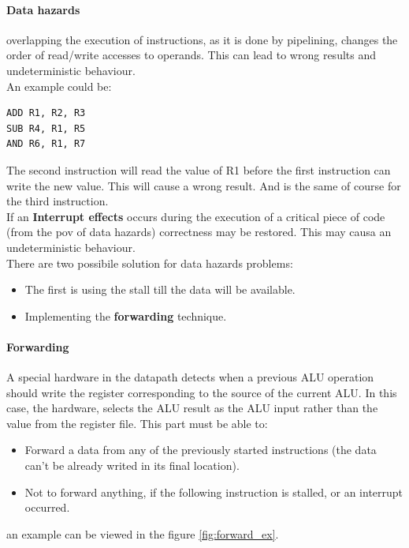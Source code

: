 \documentclass[12pt]{article}
\begin{document}
\paragraph{Data hazards} overlapping the execution of instructions, as it is done by pipelining, changes the order of read/write accesses to operands. This can lead to wrong results and undeterministic behaviour.\\
An example could be:\\
\begin{lstlisting}
ADD R1, R2, R3
SUB R4, R1, R5
AND R6, R1, R7
\end{lstlisting}
The second instruction will read the value of R1 before the first instruction can write the new value. This will cause a wrong result. And is the same of course for the third instruction.\\
If an \textbf{Interrupt effects} occurs during the execution of a critical piece of code (from the pov of data hazards) correctness may be restored. This may causa an undeterministic behaviour.\\
There are two possibile solution for data hazards problems:
\begin{itemize}
  \item The first is using the stall till the data will be available.
  \item Implementing the \textbf{forwarding} technique.
\end{itemize}

\paragraph{Forwarding} A special hardware in the datapath detects when a previous ALU operation should write the register corresponding to the source of the current ALU. In this case, the hardware, selects the ALU result as the ALU input rather than the value from the register file. This part must be able to:
\begin{itemize}
  \item Forward a data from any of the previously started instructions (the data can't be already writed in its final location).
  \item Not to forward anything, if the following instruction is stalled, or an interrupt occurred.
\end{itemize}
an example can be viewed in the figure \ref{fig:forward_ex}.
\end{document}
